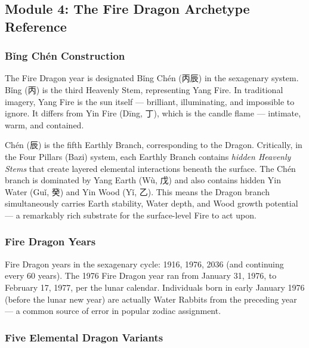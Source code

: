 \documentclass[11pt,letterpaper]{article}
\begin{document}
\subsection{Module 4: The Fire Dragon Archetype Reference}

\subsubsection{Bǐng Chén Construction}

The Fire Dragon year is designated Bǐng Chén (丙辰) in the sexagenary system. Bǐng (丙) is the third Heavenly Stem, representing Yang Fire. In traditional imagery, Yang Fire is the sun itself --- brilliant, illuminating, and impossible to ignore. It differs from Yin Fire (Dīng, 丁), which is the candle flame --- intimate, warm, and contained.

Chén (辰) is the fifth Earthly Branch, corresponding to the Dragon. Critically, in the Four Pillars (Bazi) system, each Earthly Branch contains \emph{hidden Heavenly Stems} that create layered elemental interactions beneath the surface. The Chén branch is dominated by Yang Earth (Wù, 戊) and also contains hidden Yin Water (Guǐ, 癸) and Yin Wood (Yǐ, 乙). This means the Dragon branch simultaneously carries Earth stability, Water depth, and Wood growth potential --- a remarkably rich substrate for the surface-level Fire to act upon.

\subsubsection{Fire Dragon Years}

Fire Dragon years in the sexagenary cycle: 1916, 1976, 2036 (and continuing every 60 years). The 1976 Fire Dragon year ran from January 31, 1976, to February 17, 1977, per the lunar calendar. Individuals born in early January 1976 (before the lunar new year) are actually Water Rabbits from the preceding year --- a common source of error in popular zodiac assignment.

\subsubsection{Five Elemental Dragon Variants}
\end{document}
